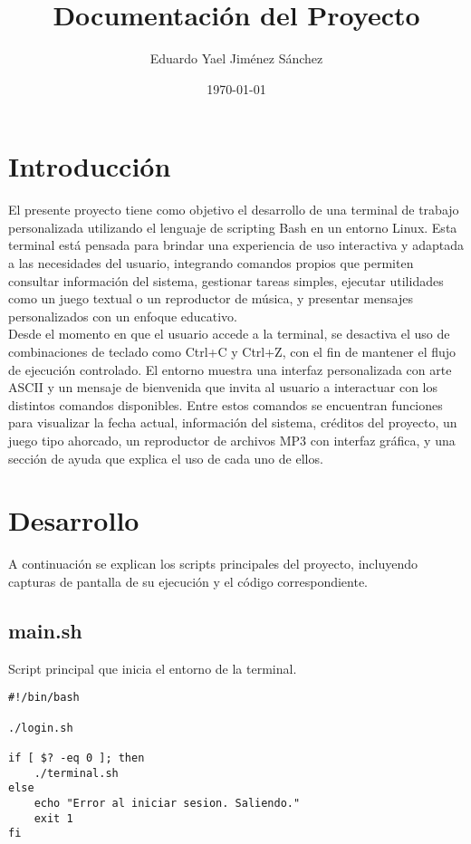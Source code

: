\documentclass[12pt]{article}
\title{\textbf{Documentación del Proyecto}}
\author{Eduardo Yael Jiménez Sánchez}
\date{\today}
\begin{document}
\maketitle
\tableofcontents
\newpage

\section{Introducción}
El presente proyecto tiene como objetivo el desarrollo de una terminal de trabajo personalizada utilizando el lenguaje de scripting Bash en un entorno Linux. Esta terminal está pensada para brindar una experiencia de uso interactiva y adaptada a las necesidades del usuario, integrando comandos propios que permiten consultar información del sistema, gestionar tareas simples, ejecutar utilidades como un juego textual o un reproductor de música, y presentar mensajes personalizados con un enfoque educativo. \\

Desde el momento en que el usuario accede a la terminal, se desactiva el uso de combinaciones de teclado como Ctrl+C y Ctrl+Z, con el fin de mantener el flujo de ejecución controlado. El entorno muestra una interfaz personalizada con arte ASCII y un mensaje de bienvenida que invita al usuario a interactuar con los distintos comandos disponibles. Entre estos comandos se encuentran funciones para visualizar la fecha actual, información del sistema, créditos del proyecto, un juego tipo ahorcado, un reproductor de archivos MP3 con interfaz gráfica, y una sección de ayuda que explica el uso de cada uno de ellos.

\section{Desarrollo}

A continuación se explican los scripts principales del proyecto, incluyendo capturas de pantalla de su ejecución y el código correspondiente.

\subsection{main.sh}
Script principal que inicia el entorno de la terminal.

\begin{lstlisting}[caption={main.sh}]
#!/bin/bash

./login.sh

if [ $? -eq 0 ]; then
    ./terminal.sh
else
    echo "Error al iniciar sesion. Saliendo."
    exit 1
fi
\end{lstlisting}
\end{document}
